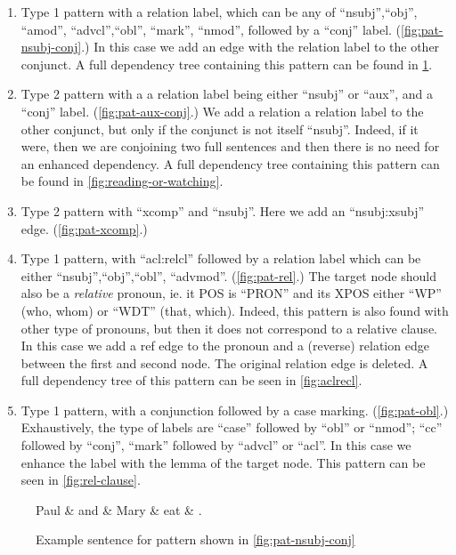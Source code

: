 \documentclass[11pt,a4paper]{article}
\begin{document}
\begin{enumerate}
\item Type 1 pattern with a relation label, which can be any of
  ``nsubj'',``obj'', ``amod'', ``advcl'',``obl'', ``mark'', ``nmod'', followed by a
  ``conj'' label. (\cref{fig:pat-nsubj-conj}.) In this case we add an
  edge with the relation label to the other conjunct.
  A full dependency tree containing this pattern can be found in \cref{fig:paul-and-mary}.
  \label{item:paul-and-mary}
\item Type 2 pattern with a a relation label being either ``nsubj'' or
  ``aux'', and a ``conj'' label. (\cref{fig:pat-aux-conj}.) We add a relation a relation label to
  the other conjunct, but only if the conjunct is not itself
  ``nsubj''. Indeed, if it were, then we are conjoining two full
  sentences and then there is no need for an enhanced dependency.
  A full dependency tree containing this pattern can be found in \cref{fig:reading-or-watching}.
  \label{item:reading-or-watching}
\item Type 2 pattern with ``xcomp'' and ``nsubj''. Here we add an
  ``nsubj:xsubj'' edge. (\cref{fig:pat-xcomp}.)
\item Type 1 pattern, with ``acl:relcl'' followed by a relation label
  which can be either ``nsubj'',``obj'',``obl'',
  ``advmod''. (\cref{fig:pat-rel}.) The target node should also be a
  \emph{relative} pronoun, ie. it POS is ``PRON'' and its XPOS either
  ``WP'' (who, whom) or ``WDT'' (that, which). Indeed, this pattern is
  also found with other type of pronouns, but then it does not
  correspond to a relative clause.  In this case we add a ref edge to
  the pronoun and a (reverse) relation edge between the first and
  second node. The original relation edge is deleted. A full dependency
  tree of this pattern can be seen in \cref{fig:aclrecl}.
  \item Type 1 pattern, with a conjunction followed by a case
   marking. (\cref{fig:pat-obl}.) Exhaustively, the type of labels
   are ``case'' followed by ``obl'' or ``nmod''; ``cc'' followed by
   ``conj'', ``mark'' followed by ``advcl'' or ``acl''. In this case we
   enhance the label with the lemma of the target node. This pattern
   can be seen in \cref{fig:rel-clause}.
\end{enumerate}

\begin{figure}
    \centering
    \begin{dependency}
    \begin{deptext}[column sep=1em]
    Paul \& and \& Mary \& eat \& . \\
    \end{deptext}
    \end{dependency}
    \caption{Example sentence for pattern shown in \cref{fig:pat-nsubj-conj}}
    \label{fig:paul-and-mary}
\end{figure}
\end{document}
